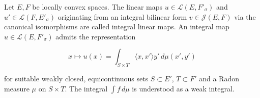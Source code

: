 Let $E, F$ be locally convex spaces. The linear maps $u \in \mathcal{L}(E, F'_\sigma)$ and $u' \in \mathcal{L}(F, E'_\sigma)$ originating from an integral bilinear form $v \in \mathcal{J}(E, F)$ via the canonical isomorphisms are called integral linear maps. An integral map $u \in \mathcal{L}(E, F'_\sigma)$ admits the representation

$$x \mapsto u(x) = \int_{S \times T} \langle x, x' \rangle y' \, d\mu(x', y')$$

for suitable weakly closed, equicontinuous sets $S \subset E'$, $T \subset F'$ and a Radon measure $\mu$ on $S \times T$. The integral $\int f \, d\mu$ is understood as a weak integral.
